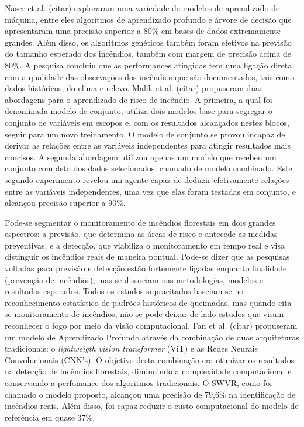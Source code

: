 Naser et al. (citar) exploraram uma variedade de modelos de aprendizado de máquina, entre eles algoritmos de aprendizado profundo e árvore de decisão que apresentaram uma precisão superior a 80\% em bases de dados extremamente grandes. Além disso, os algoritmos genéticos também foram efetivos na previsão do tamanho esperado dos incêndios, também com margem de precisão acima de 80\%. A pesquisa concluiu que as performances atingidas tem uma ligação direta com a qualidade das observações dos incêndios que são documentados, tais como dados históricos, do clima e relevo. Malik et al. (citar) propuseram duas abordagens para o aprendizado de risco de incêndio. A primeira, a qual foi denominada modelo de conjunto, utiliza dois modelos base para segregar o conjunto de variáveis em escopos e, com os resultados alcançados nestes blocos, seguir para um novo treinamento. O modelo de conjunto se provou incapaz de derivar as relações entre as variáveis independentes para atingir resultados mais concisos. A segunda abordagem utilizou apenas um modelo que recebeu um conjunto completo dos dados selecionados, chamado de modelo combinado. Este segundo experimento revelou um agente capaz de deduzir efetivamente relações entre as variáveis independentes, uma vez que elas foram testadas em conjunto, e alcançou precisão superior a 90\%.

Pode-se segmentar o monitoramento de incêndios florestais em dois grandes espectros: a previsão, que determina as áreas de risco e antecede as medidas preventivas; e a detecção, que viabiliza o monitoramento em tempo real e visa distinguir os incêndios reais de maneira pontual. Pode-se dizer que as pesquisas voltadas para previsão e detecção estão fortemente ligadas enquanto finalidade (prevenção de incêndios), mas se dissociam nas metodologias, modelos e resultados esperados. Todos os estudos supracitados baseiam-se no reconhecimento estatístico de padrões históricos de queimadas, mas quando cita-se monitoramento de incêndios, não se pode deixar de lado estudos que visam reconhecer o fogo por meio da visão computacional. Fan et al. (citar) propuseram um modelo de Aprendizado Profundo através da combinação de duas arquiteturas tradicionais: o \textit{lightweigth vision transformer} (ViT) e as Redes Neurais Convolucionais (CNN's). O objetivo desta combinação era otimizar os resultados na detecção de incêndios florestais, diminuindo a complexidade computacional e conservando a perfomance dos algoritmos tradicionais. O SWVR, como foi chamado o modelo proposto, alcançou uma precisão de 79,6\% na identificação de incêndios reais. Além disso, foi capaz reduzir o custo computacional do modelo de referência em quase 37\%.

